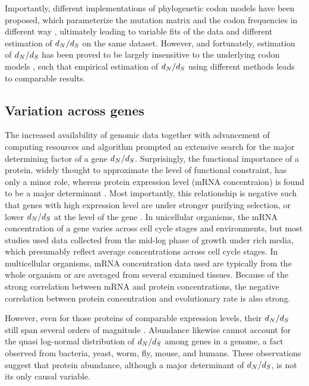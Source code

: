 Importantly, different implementations of phylogenetic \gls{codon} models have been proposed, which parameterize the mutation matrix and the \gls{codon} frequencies in different way \citep{Muse1994, Goldman1994}, ultimately leading to variable fits of the data and different estimation of $d_N / d_S$ on the same dataset. 
However, and fortunately, estimation of $d_N / d_S$ has been proved to be largely insensitive to the underlying \gls{codon} models \citep{Spielman2018}, such that empirical estimation of $d_N / d_S$ using different methods leads to comparable results.

\subsection{Variation across genes}

The increased availability of genomic data together with advancement of computing resources and algorithm prompted an extensive search for the major determining factor of a gene $d_N / d_S$.
Surprisingly, the functional importance of a protein, widely thought to approximate the level of functional constraint, has only a minor role, whereas protein expression level (mRNA concentraion) is found to be a major determinant \citep{Zhang2015}.
Most importantly, this relationship is negative such that genes with high expression level are under stronger purifying selection, or lower $d_N / d_S$ at the level of the gene \citep{Duret2000, Drummond2005a, Zhang2015}.
In unicellular organisms, the mRNA concentration of a gene varies across cell cycle stages and environments, but most studies used data collected from the mid-log phase of growth under rich media, which presumably reflect average concentrations across cell cycle stages.
In multicellular organisms, mRNA concentration data used are typically from the whole organism or are averaged from several examined tissues.
Because of the strong correlation between mRNA and protein concentrations, the negative correlation between protein concentration and evolutionary rate is also strong.

However, even for those proteins of comparable expression levels, their $d_N / d_S$ still span several orders of magnitude \citep{Drummond2008}.
Abundance likewise cannot account for the quasi log-normal distribution of $d_N / d_S$ among genes in a genome, a fact observed from bacteria, yeast, worm, fly, mouse, and humans.
These observations suggest that protein abundance, although a major determinant of $d_N / d_S$, is not its only causal variable.

